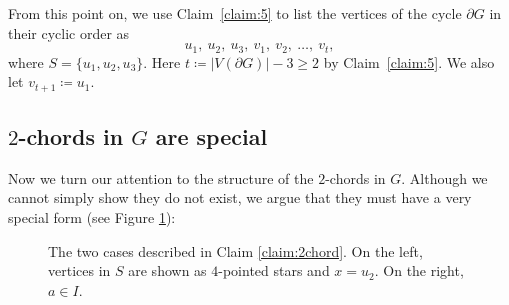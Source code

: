 \documentclass[11pt]{article}
\theoremstyle{slantthm}
\numberwithin{equation}{section}
\theoremstyle{definition}
\renewcommand{\geq}{\geqslant}
\newcommand{\defeq}{\coloneqq}
\numberwithin{equation}{section}
\newcommand{\0}{\varnothing}
\newcommand{\set}[1]{\{#1\}}
\newcommand{\bdry}[1]{{\partial #1}}
\begin{document}
    From this point on, we use Claim~\ref{claim:5} to list the vertices of the cycle $\bdry{G}$ in their cyclic order as \[u_1,\ u_2,\ u_3,\ v_1,\ v_2,\ \ldots,\ v_t,\] where $S = \set{u_1, u_2, u_3}$. Here $t \defeq |V(\bdry{G})| - 3 \geq 2$ by Claim~\ref{claim:5}. We also let $v_{t+1} \defeq u_1$. %

    \subsection{$2$-chords in $G$ are special}

    Now we turn our attention to the structure of the $2$-chords in $G$. Although we cannot simply show they do not exist, we argue that they must have a very special form (see Figure \ref{fig:2chordsspecial}):

\begin{figure}[t]
        \centering
       
       \caption{The two cases described in Claim \ref{claim:2chord}. On the left, vertices in $S$ are shown as $4$-pointed stars and $x = u_2$. On the right, $a \in I$.}\label{fig:2chordsspecial}
\end{figure}
\end{document}
